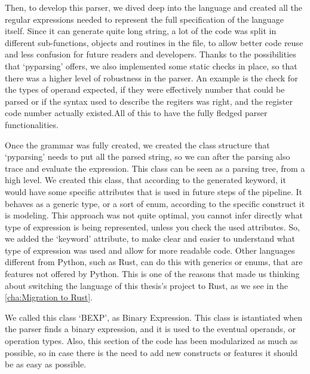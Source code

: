 Then, to develop this parser, we dived deep into the language and created all
the regular expressions needed to represent the full specification of the
language itself. Since it can generate quite long string, a lot of the code was
split in different sub-functions, objects and routines in the file, to allow
better code reuse and less confusion for future readers and developers. Thanks to
the possibilities that `pyparsing' offers, we also implemented some static
checks in place, so that there was a higher level of robustness in the parser.
An example is the check for the types of operand expected, if they were effectively
number that could be parsed or if the syntax used to describe the regiters was right,
and the register code number actually existed.All of this to have the fully
fledged parser functionalities.

Once the grammar was fully created, we created the class structure that `pyparsing'
needs to put all the parsed string, so we can after the parsing also trace and
evaluate the expression. This class can be seen as a parsing tree, from a high
level. We created this class, that according to the generated keyword, it would have
some specific attributes that is used in future steps of the pipeline. It
behaves as a generic type, or a sort of enum, according to the specific
construct it is modeling. This approach was not quite optimal, you cannot infer
directly what type of expression is being represented, unless you check the used
attributes. So, we added the `keyword' attribute, to make clear and easier to
understand what type of expression was used and allow for more readable code. Other
languages different from Python, such as Rust, can do this with generics or enums,
that are features not offered by Python. This is one of the reasons that made us
thinking about switching the language of this thesis's project to Rust, as we
see in the \cref{cha:Migration to Rust}.

We called this class `BEXP', as Binary Expression. This class is istantiated
when the parser finds a binary expression, and it is used to the eventual operands,
or operation types. Also, this section of the code has been modularized as much
as possible, so in case there is the need to add new constructs or features it should
be as easy as possible.

